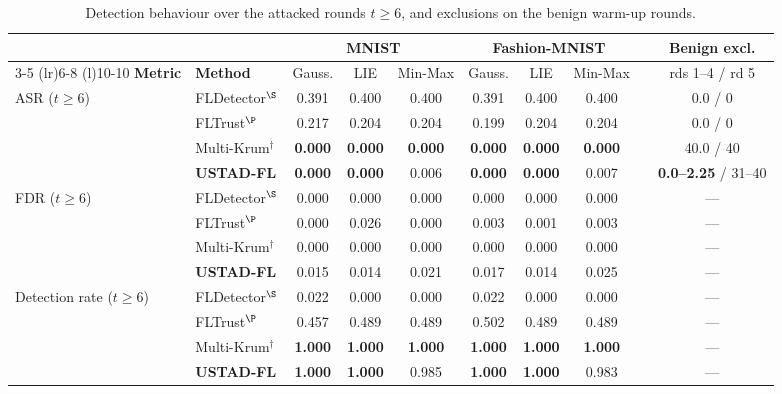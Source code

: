 \documentclass[journal]{IEEEtran}
\begin{document}
\begin{table}[!t]
\centering
\caption{Detection behaviour over the attacked rounds $t \ge 6$, and exclusions on the benign warm-up rounds.}
\label{tab:detection_results}
\footnotesize
\setlength{\tabcolsep}{4.5pt}
\begin{tabular}{@{}llcccccc@{}cc@{}}
\toprule
& & \multicolumn{3}{c}{\textbf{MNIST}} & \multicolumn{3}{c}{\textbf{Fashion-MNIST}} & & \multicolumn{1}{c}{\textbf{Benign excl.}} \\
\cmidrule(lr){3-5} \cmidrule(lr){6-8} \cmidrule(l){10-10}
\textbf{Metric} & \textbf{Method} & Gauss. & LIE & Min-Max & Gauss. & LIE & Min-Max & & rds 1--4 / rd 5 \\
\midrule
\multirow{4}{*}{ASR ($t \ge 6$)}
 & FLDetector$^{\S}$   & 0.391 & 0.400 & 0.400 & 0.391 & 0.400 & 0.400 & & 0.0 / 0 \\
 & FLTrust$^{\P}$      & 0.217 & 0.204 & 0.204 & 0.199 & 0.204 & 0.204 & & 0.0 / 0 \\
 & Multi-Krum$^\dagger$ & \textbf{0.000} & \textbf{0.000} & \textbf{0.000} & \textbf{0.000} & \textbf{0.000} & \textbf{0.000} & & 40.0 / 40 \\
 & \textbf{USTAD-FL}   & \textbf{0.000} & \textbf{0.000} & 0.006 & \textbf{0.000} & \textbf{0.000} & 0.007 & & \textbf{0.0--2.25} / 31--40 \\
\midrule
\multirow{4}{*}{FDR ($t \ge 6$)}
 & FLDetector$^{\S}$   & 0.000 & 0.000 & 0.000 & 0.000 & 0.000 & 0.000 & & --- \\
 & FLTrust$^{\P}$      & 0.000 & 0.026 & 0.000 & 0.003 & 0.001 & 0.003 & & --- \\
 & Multi-Krum$^\dagger$ & 0.000 & 0.000 & 0.000 & 0.000 & 0.000 & 0.000 & & --- \\
 & \textbf{USTAD-FL}   & 0.015 & 0.014 & 0.021 & 0.017 & 0.014 & 0.025 & & --- \\
\midrule
\multirow{4}{*}{Detection rate ($t \ge 6$)}
 & FLDetector$^{\S}$   & 0.022 & 0.000 & 0.000 & 0.022 & 0.000 & 0.000 & & --- \\
 & FLTrust$^{\P}$      & 0.457 & 0.489 & 0.489 & 0.502 & 0.489 & 0.489 & & --- \\
 & Multi-Krum$^\dagger$ & \textbf{1.000} & \textbf{1.000} & \textbf{1.000} & \textbf{1.000} & \textbf{1.000} & \textbf{1.000} & & --- \\
 & \textbf{USTAD-FL}   & \textbf{1.000} & \textbf{1.000} & 0.985 & \textbf{1.000} & \textbf{1.000} & 0.983 & & --- \\
\bottomrule
\end{tabular}


\end{table}
\end{document}
